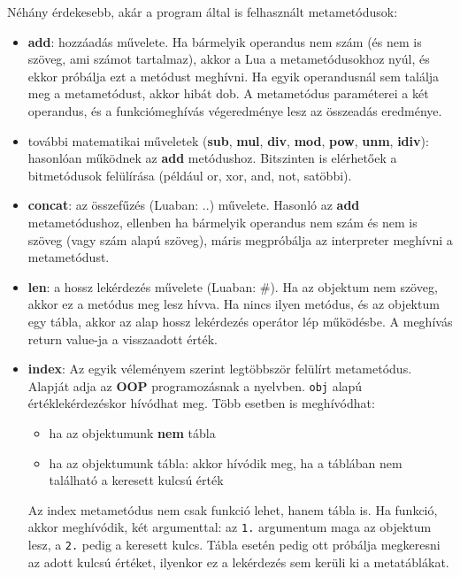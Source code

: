Néhány érdekesebb, akár a program által is felhasznált metametódusok:
\begin{itemize}
	\item \detokenize{__}\textbf{add}: hozzáadás művelete. Ha bármelyik operandus nem szám (és nem is szöveg, ami számot tartalmaz), akkor a Lua a metametódusokhoz nyúl, és ekkor próbálja ezt a metódust meghívni. Ha egyik operandusnál sem találja meg a metametódust, akkor hibát dob. A metametódus paraméterei a két operandus, és a funkciómeghívás végeredménye lesz az összeadás eredménye.
	\item további matematikai műveletek (\detokenize{__}\textbf{sub}, \detokenize{__}\textbf{mul}, \detokenize{__}\textbf{div}, \detokenize{__}\textbf{mod}, \detokenize{__}\textbf{pow}, \detokenize{__}\textbf{unm}, \detokenize{__}\textbf{idiv}): hasonlóan működnek az \detokenize{__}\textbf{add} metódushoz. Bitszinten is elérhetőek a bitmetódusok felülírása (például or, xor, and, not, satöbbi).
	\item \detokenize{__}\textbf{concat}: az összefűzés (Luaban: ..) művelete. Hasonló az \detokenize{__}\textbf{add} metametódushoz, ellenben ha bármelyik operandus nem szám és nem is szöveg (vagy szám alapú szöveg), máris megpróbálja az interpreter meghívni a metametódust.
	\item \detokenize{__}\textbf{len}: a hossz lekérdezés művelete (Luaban: \#). Ha az objektum nem szöveg, akkor ez a metódus meg lesz hívva. Ha nincs ilyen metódus, és az objektum egy tábla, akkor az alap hossz lekérdezés operátor lép működésbe. A meghívás return value-ja a visszaadott érték.
	\pagebreak
	\item \detokenize{__}\textbf{index}: Az egyik véleményem szerint legtöbbször felülírt metametódus. Alapját adja az \textbf{OOP} programozásnak a nyelvben. \texttt{obj}\detokenize{[key]} alapú értéklekérdezéskor hívódhat meg. Több esetben is meghívódhat:
		\begin{itemize}
			\item ha az objektumunk \textbf{nem} tábla
			\item ha az objektumunk tábla: akkor hívódik meg, ha a táblában nem található a keresett kulcsú érték
		\end{itemize} Az index metametódus nem csak funkció lehet, hanem tábla is. Ha funkció, akkor meghívódik, két argumenttal: az \texttt{1.} argumentum maga az objektum lesz, a \texttt{2.} pedig a keresett kulcs. Tábla esetén pedig ott próbálja megkeresni az adott kulcsú értéket, ilyenkor ez a lekérdezés sem kerüli ki a metatáblákat.

\end{itemize}
